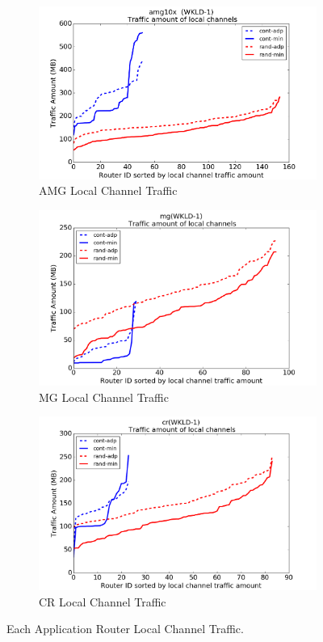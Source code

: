 \documentclass[conference,compsoc]{IEEEtran}
\begin{document}
\begin{figure}[t!]
    \centering
    \begin{subfigure}[t]{0.32\textwidth}
        \centering
        \includegraphics[height=1.5 in]{syn-wkld/amg10/lc-traffic}
        \caption{AMG Local Channel Traffic}
        \label{fig:samg-lc-traffic}
    \end{subfigure}%
    \hspace{1em}%
    \begin{subfigure}[t]{0.32\textwidth}
        \centering
        \includegraphics[height=1.5 in]{syn-wkld/mg/lc-traffic}
        \caption{MG Local Channel Traffic}
        \label{fig:syn-mg-lc-traffic}
    \end{subfigure}%
    \begin{subfigure}[t]{0.32\textwidth}
        \centering
        \includegraphics[height=1.5 in]{syn-wkld/cr/lc-traffic}
        \caption{CR Local Channel Traffic}
        \label{fig:syn-cr-lc-traffic}
    \end{subfigure}%
   \caption{Each Application Router Local Channel Traffic.  }
   \label{fig:syn-3app-lc-traffic}
\end{figure}
\end{document}
